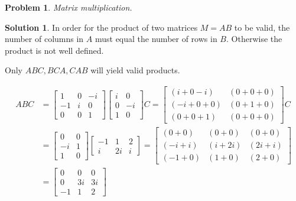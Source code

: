 \documentclass{article}
\newtheorem{problem}{Problem}
\theoremstyle{definition}
\newtheorem*{solution}{Solution}
\begin{document}
\begin{problem} 

Matrix multiplication.

\end{problem}

\begin{solution}

In order for the product of two matrices $M=AB$ to be valid, the number of columns in $A$ must equal the number of rows in $B$.
Otherwise the product is not well defined.

Only $ABC,BCA,CAB$ will yield valid products.

\begin{align*}
ABC&=
\begin{bmatrix}
1 & 0 & -i \\
-1 & i & 0 \\
0 & 0 & 1
\end{bmatrix}
\begin{bmatrix}
i & 0 \\
0 & -i \\
1 & 0
\end{bmatrix} C =
\begin{bmatrix}
(i+0-i) & (0+0+0) \\
(-i+0+0) & (0+1+0) \\
(0+0+1) & (0+0+0)
\end{bmatrix} C \\
&=
\begin{bmatrix}
0 & 0 \\
-i & 1 \\
1 & 0
\end{bmatrix}
\begin{bmatrix}
-1 & 1 & 2 \\
i & 2i & i
\end{bmatrix} =
\begin{bmatrix}
(0+0) & (0+0) & (0+0) \\
(-i+i) & (i+2i) & (2i+i) \\
(-1+0) & (1+0) & (2+0)
\end{bmatrix} \\
&=
\boxed{
\begin{bmatrix}
0 & 0&0\\
0&3i&3i\\
-1&1&2
\end{bmatrix}}
\end{align*}


\end{solution}
\end{document}
